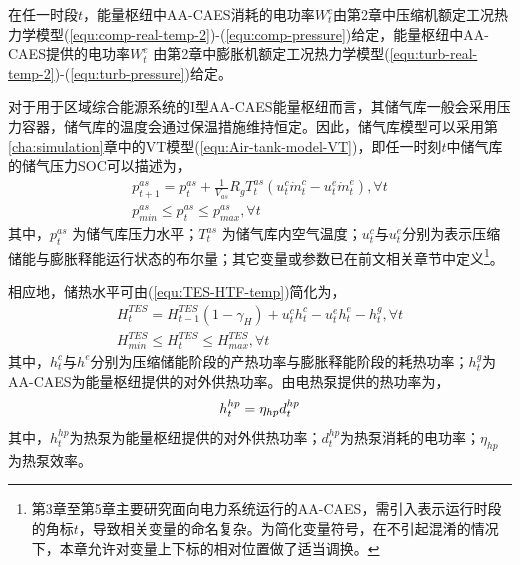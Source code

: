 

在任一时段$t$，能量枢纽中AA-CAES消耗的电功率$W_t^c$由第2章中压缩机额定工况热力学模型(\ref{equ:comp-real-temp-2})-(\ref{equ:comp-pressure})给定，能量枢纽中AA-CAES提供的电功率$W_t^e$ 由第2章中膨胀机额定工况热力学模型(\ref{equ:turb-real-temp-2})-(\ref{equ:turb-pressure})给定。

对于用于区域综合能源系统的I型AA-CAES能量枢纽而言，其储气库一般会采用压力容器，储气库的温度会通过保温措施维持恒定。因此，储气库模型可以采用第\ref{cha:simulation}章中的VT模型(\ref{equ:Air-tank-model-VT})，即任一时刻$t$中储气库的储气压力SOC可以描述为，
\begin{subequations}
\label{eq:hub-pressure-SOC}
\begin{gather}
p_{t + 1}^{as} = p_{t}^{as} + \frac{1}{V_{as}}{R_g}T_t^{as}\left( {u_{t}^c \dot m_{t}^c - u_{t}^e \dot m_{t}^e} \right),\forall t\\
p_{min}^{as} \le p_{t}^{as} \le p_{max}^{as},\forall t
\end{gather}
\end{subequations}
其中，$p_{t}^{as}$ 为储气库压力水平；$T_t^{as}$ 为储气库内空气温度；$u_t^c$与$u_t^e$分别为表示压缩储能与膨胀释能运行状态的布尔量；其它变量或参数已在前文相关章节中定义\footnote{第3章至第5章主要研究面向电力系统运行的AA-CAES，需引入表示运行时段的角标$t$，导致相关变量的命名复杂。为简化变量符号，在不引起混淆的情况下，本章允许对变量上下标的相对位置做了适当调换。}。

相应地，储热水平可由(\ref{equ:TES-HTF-temp})简化为，
\begin{subequations}
\label{eq:hub-thermal-SOC}
\begin{gather}
H_{t}^{TES} = H_{t - 1}^{TES}(1-\gamma_H) + u_{t}^c h_{t}^c - u_{t}^e h_{t}^e - h_{t}^g,\forall t \label{eq:hub-thermal-SOC-Eq}\\
H_{min}^{TES} \le H_{t}^{TES} \le H_{max}^{TES},\forall t
\end{gather}
\end{subequations}
其中，$h_t^c$与$h^e$分别为压缩储能阶段的产热功率与膨胀释能阶段的耗热功率；$h_t^g$为AA-CAES为能量枢纽提供的对外供热功率。由电热泵提供的热功率为，
\begin{equation}
\label{equ:model-HP}
h_{t}^{hp} = \eta_{hp}d_{t}^{hp} \\
\end{equation}
其中，$h_{t}^{hp}$为热泵为能量枢纽提供的对外供热功率；$d_{t}^{hp}$为热泵消耗的电功率；$\eta_{hp}$为热泵效率。

